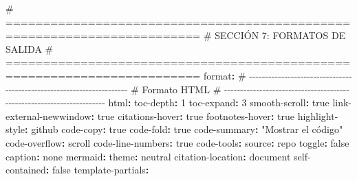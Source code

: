 \documentclass[
  doc,
  floatsintext,
  longtable,
  a4paper,
  nolmodern,
  notxfonts,
  notimes,
  12pt,
  colorlinks=true,linkcolor=blue,citecolor=blue,urlcolor=blue]{apa7}
\newenvironment{Shaded}{\begin{snugshade}}{\end{snugshade}}
\newcommand{\AttributeTok}[1]{\textcolor[rgb]{0.40,0.45,0.13}{#1}}
\newcommand{\CharTok}[1]{\textcolor[rgb]{0.13,0.47,0.30}{#1}}
\newcommand{\CommentTok}[1]{\textcolor[rgb]{0.37,0.37,0.37}{#1}}
\newcommand{\DecValTok}[1]{\textcolor[rgb]{0.68,0.00,0.00}{#1}}
\newcommand{\FunctionTok}[1]{\textcolor[rgb]{0.28,0.35,0.67}{#1}}
\newcommand{\KeywordTok}[1]{\textcolor[rgb]{0.00,0.23,0.31}{\textbf{#1}}}
\newcommand{\StringTok}[1]{\textcolor[rgb]{0.13,0.47,0.30}{#1}}
\newcounter{none} %
\begin{document}
\begin{Shaded}
\begin{Highlighting}[]
\CommentTok{\# ========================================================================}
\CommentTok{\# SECCIÓN 7: FORMATOS DE SALIDA}
\CommentTok{\# ========================================================================}
\FunctionTok{format}\KeywordTok{:}
\CommentTok{  \# {-}{-}{-}{-}{-}{-}{-}{-}{-}{-}{-}{-}{-}{-}{-}{-}{-}{-}{-}{-}{-}{-}{-}{-}{-}{-}{-}{-}{-}{-}{-}{-}{-}{-}{-}{-}{-}{-}{-}{-}{-}{-}{-}{-}{-}{-}{-}{-}{-}{-}{-}{-}{-}{-}{-}{-}{-}{-}{-}{-}{-}{-}{-}{-}{-}{-}{-}{-}{-}{-}}
\CommentTok{  \# Formato HTML}
\CommentTok{  \# {-}{-}{-}{-}{-}{-}{-}{-}{-}{-}{-}{-}{-}{-}{-}{-}{-}{-}{-}{-}{-}{-}{-}{-}{-}{-}{-}{-}{-}{-}{-}{-}{-}{-}{-}{-}{-}{-}{-}{-}{-}{-}{-}{-}{-}{-}{-}{-}{-}{-}{-}{-}{-}{-}{-}{-}{-}{-}{-}{-}{-}{-}{-}{-}{-}{-}{-}{-}{-}{-}}
\AttributeTok{  }\FunctionTok{html}\KeywordTok{:}
\AttributeTok{    }\FunctionTok{toc{-}depth}\KeywordTok{:}\AttributeTok{ }\DecValTok{1}
\AttributeTok{    }\FunctionTok{toc{-}expand}\KeywordTok{:}\AttributeTok{ }\DecValTok{3}
\AttributeTok{    }\FunctionTok{smooth{-}scroll}\KeywordTok{:}\AttributeTok{ }\CharTok{true}
\AttributeTok{    }\FunctionTok{link{-}external{-}newwindow}\KeywordTok{:}\AttributeTok{ }\CharTok{true}
\AttributeTok{    }\FunctionTok{citations{-}hover}\KeywordTok{:}\AttributeTok{ }\CharTok{true}
\AttributeTok{    }\FunctionTok{footnotes{-}hover}\KeywordTok{:}\AttributeTok{ }\CharTok{true}
\AttributeTok{    }\FunctionTok{highlight{-}style}\KeywordTok{:}\AttributeTok{ github}
\AttributeTok{    }\FunctionTok{code{-}copy}\KeywordTok{:}\AttributeTok{ }\CharTok{true}
\AttributeTok{    }\FunctionTok{code{-}fold}\KeywordTok{:}\AttributeTok{ }\CharTok{true}
\AttributeTok{    }\FunctionTok{code{-}summary}\KeywordTok{:}\AttributeTok{ }\StringTok{"Mostrar el código"}
\AttributeTok{    }\FunctionTok{code{-}overflow}\KeywordTok{:}\AttributeTok{ scroll}
\AttributeTok{    }\FunctionTok{code{-}line{-}numbers}\KeywordTok{:}\AttributeTok{ }\CharTok{true}
\AttributeTok{    }\FunctionTok{code{-}tools}\KeywordTok{:}
\AttributeTok{      }\FunctionTok{source}\KeywordTok{:}\AttributeTok{ repo}
\AttributeTok{      }\FunctionTok{toggle}\KeywordTok{:}\AttributeTok{ }\CharTok{false}
\AttributeTok{      }\FunctionTok{caption}\KeywordTok{:}\AttributeTok{ none}
\AttributeTok{    }\FunctionTok{mermaid}\KeywordTok{:}
\AttributeTok{      }\FunctionTok{theme}\KeywordTok{:}\AttributeTok{ neutral}
\AttributeTok{    }\FunctionTok{citation{-}location}\KeywordTok{:}\AttributeTok{ document}
\AttributeTok{    }\FunctionTok{self{-}contained}\KeywordTok{:}\AttributeTok{ }\CharTok{false}
\AttributeTok{    }\FunctionTok{template{-}partials}\KeywordTok{:}

\end{Highlighting}
\end{Shaded}
\end{document}
